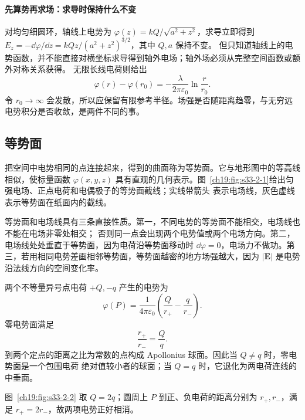 \paragraph{先算势再求场：求导时保持什么不变}
对均匀细圆环，轴线上电势为 $\varphi(z)=kQ/\sqrt{a^2+z^2}$，求导立即得到
$E_z=-\dd\varphi/\dd z=kQz/(a^2+z^2)^{3/2}$，其中 $Q,a$ 保持不变。
但只知道轴线上的电势函数，并不能直接对横坐标求导得到轴外电场；轴外场必须从完整空间函数或额外对称关系获得。
无限长线电荷则给出
\[
 \varphi(r)-\varphi(r_0)=-\frac{\lambda}{2\pi\varepsilon_0}\ln\frac r{r_0}.
\]
令 $r_0\to\infty$ 会发散，所以应保留有限参考半径。场强是否随距离趋零，与无穷远电势积分是否收敛，是两件不同的事。


\subsection{等势面}


把空间中电势相同的点连接起来，得到的曲面称为等势面。它与地形图中的等高线相似，使标量函数
$\varphi(x,y,z)$ 具有直观的几何表示。图~\ref{ch19:fig:s33-2-1}给出匀强电场、正点电荷和电偶极子的等势面截线；实线带箭头
表示电场线，灰色虚线表示等势面在纸面内的截线。

\par\noindent\begin{minipage}{\linewidth}
\equipotentialGallery
{}\label{ch19:fig:s33-2-1}
\end{minipage}\par\medskip

等势面和电场线具有三条直接性质。第一，不同电势的等势面不能相交，电场线也不能在电场非零处相交；
否则同一点会出现两个电势值或两个电场方向。第二，电场线处处垂直于等势面，因为电荷沿等势面移动时
$\dd\varphi=0$，电场力不做功。第三，若用相同电势差画相邻等势面，等势面越密的地方场强越大，因为
$|\boldsymbol E|$ 是电势沿法线方向的空间变化率。

两个不等量异号点电荷 $+Q,-q$ 产生的电势为
\[
  \varphi(P)=\frac{1}{4\pi\varepsilon_0}
  \left(\frac{Q}{r_+}-\frac{q}{r_-}\right).
\]
零电势面满足
\[
  \frac{r_+}{r_-}=\frac{Q}{q}.
\]
到两个定点的距离之比为常数的点构成 Apollonius 球面。因此当 $Q\ne q$ 时，零电势面是一个包围电荷
绝对值较小者的球面；当 $Q=q$ 时，它退化为两电荷连线的中垂面。

图~\ref{ch19:fig:s33-2-2} 取 $Q=2q$；圆周上 $P$ 到正、负电荷的距离分别为 $r_+,r_-$，满足 $r_+=2r_-$，故两项电势正好相消。

\par\noindent\begin{minipage}{\linewidth}
\zeroEquipotentialFigure
{}\label{ch19:fig:s33-2-2}
\end{minipage}\par\medskip


